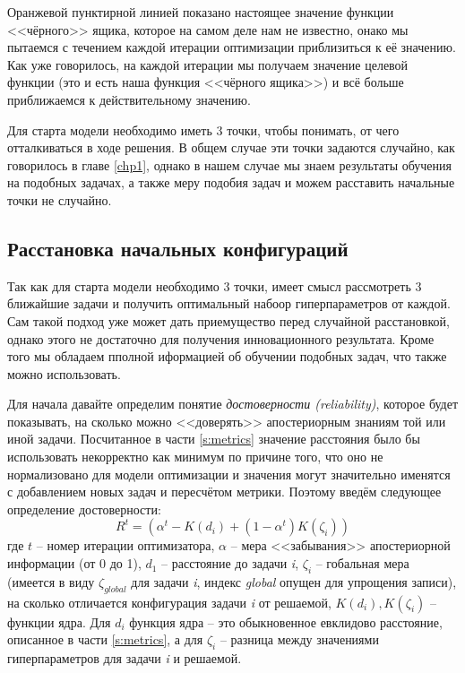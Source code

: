 \documentclass[times,specification,annotation]{itmo-student-thesis}
\begin{document}
	Оранжевой пунктирной линией показано настоящее значение функции <<чёрного>> ящика, которое на самом деле нам не известно, онако мы пытаемся с течением каждой итерации оптимизации приблизиться к её значению. Как уже говорилось, на каждой итерации мы получаем значение целевой функции (это и есть наша функция <<чёрного ящика>>) и всё больше приближаемся к действительному значению. \par
	Для старта модели необходимо иметь 3 точки, чтобы понимать, от чего отталкиваться в ходе решения. В общем случае эти точки задаются случайно, как говорилось в главе \ref{chp1}, однако в нашем случае мы знаем результаты обучения на подобных задачах, а также меру подобия задач и можем расставить начальные точки не случайно.
	\subsection{Расстановка начальных конфигураций}
	Так как для старта модели необходимо 3 точки, имеет смысл рассмотреть 3 ближайшие задачи и получить оптимальный набоор гиперпараметров от каждой. Сам такой подход уже может дать приемущество перед случайной расстановкой, однако этого не достаточно для получения инновационного результата. Кроме того мы обладаем пполной иформацией об обучении подобных задач, что также можно использовать. \par 
	Для начала давайте определим понятие \textit{достоверности (reliability)}, которое будет показывать, на сколько можно <<доверять>> апостериорным знаниям той или иной задачи. Посчитанное в части \ref{s:metrics} значение расстояния было бы использовать некорректно как минимум по причине того, что оно не нормализовано для модели оптимизации и значения могут значительно именятся с добавлением новых задач и пересчётом метрики. Поэтому введём следующее определение достоверности:
	\begin{equation}
	\mathit R^{t}=(\alpha^{t}-K(d_{i})+(1-\alpha^{t})K(\zeta_{i}))
	\label{eq:rel}
	\end{equation}
	где $ t $ -- номер итерации оптимизатора, $ \alpha $ -- мера <<забывания>> апостериорной информации (от 0 до 1), $ d_{1} $ -- расстояние до задачи \textit{i}, $ \zeta_{i} $ -- гобальная мера (имеется в виду $ \zeta_{global}  $ для задачи \textit{i}, индекс \textit{global} опущен для упрощения записи), на сколько отличается конфигурация задачи \textit{i} от решаемой, $ K(d_{i}), K(\zeta_{i})$ -- функции ядра. Для $ d_{i} $ функция ядра -- это обыкновенное евклидово расстояние, описанное в части \ref{s:metrics}, а  для $ \zeta_{i} $ -- разница между значениями гиперпараметров для задачи \textit{i} и решаемой. \par 
\end{document}

